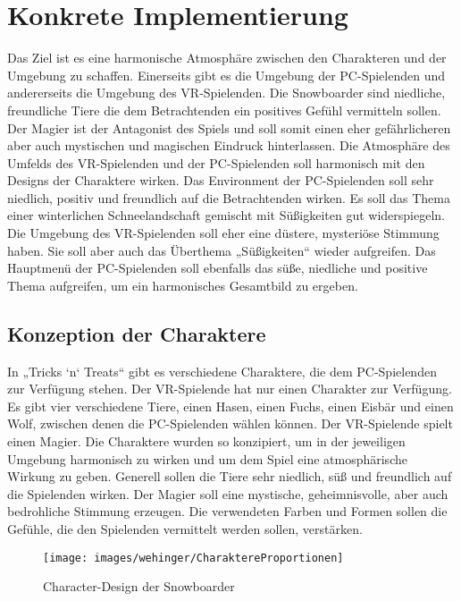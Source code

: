 \chapter{Konkrete Implementierung}
Das Ziel ist es eine harmonische Atmosphäre zwischen den Charakteren und der Umgebung zu schaffen. Einerseits gibt es die Umgebung der PC-Spielenden und andererseits die Umgebung des VR-Spielenden. Die Snowboarder sind niedliche, freundliche Tiere die dem Betrachtenden ein positives Gefühl vermitteln sollen. Der Magier ist der Antagonist des Spiels und soll somit einen eher gefährlicheren aber auch mystischen und magischen Eindruck hinterlassen. Die Atmosphäre des Umfelds des VR-Spielenden und der PC-Spielenden soll harmonisch mit den Designs der Charaktere wirken. Das Environment der PC-Spielenden soll sehr niedlich, positiv und freundlich auf die Betrachtenden wirken. Es soll das Thema einer winterlichen Schneelandschaft gemischt mit Süßigkeiten gut widerspiegeln. Die Umgebung des VR-Spielenden soll eher eine düstere, mysteriöse Stimmung haben. Sie soll aber auch das Überthema „Süßigkeiten“ wieder aufgreifen. Das Hauptmenü der PC-Spielenden soll ebenfalls das süße, niedliche und positive Thema aufgreifen, um ein harmonisches Gesamtbild zu ergeben.

\section{Konzeption der Charaktere}
In „Tricks ‘n‘ Treats“ gibt es verschiedene Charaktere, die dem PC-Spielenden zur Verfügung stehen. Der VR-Spielende hat nur einen Charakter zur Verfügung. Es gibt vier verschiedene Tiere, einen Hasen, einen Fuchs, einen Eisbär und einen Wolf, zwischen denen die PC-Spielenden wählen können. Der VR-Spielende spielt einen Magier. Die Charaktere wurden so konzipiert, um in der jeweiligen Umgebung harmonisch zu wirken und um dem Spiel eine atmosphärische Wirkung zu geben. Generell sollen die Tiere sehr niedlich, süß und freundlich auf die Spielenden wirken. Der Magier soll eine mystische, geheimnisvolle, aber auch bedrohliche Stimmung erzeugen. Die verwendeten Farben und Formen sollen die Gefühle, die den Spielenden vermittelt werden sollen, verstärken.
 
 \begin{figure}[H]
 	\centering
 	\texttt{[image: images/wehinger/CharaktereProportionen]}
 	\caption{Character-Design der Snowboarder}
 \end{figure}


